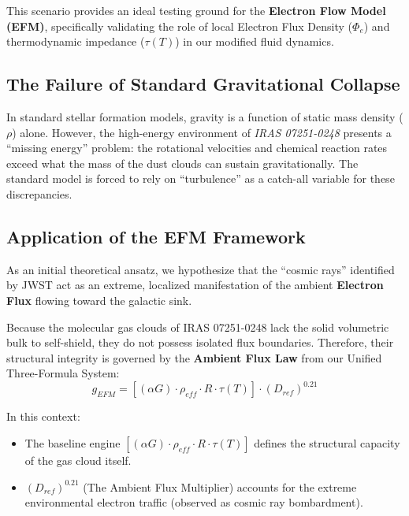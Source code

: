\documentclass[11pt, a4paper]{article}
\begin{document}
This scenario provides an ideal testing ground for the \textbf{Electron Flow Model (EFM)}, specifically validating the role of local Electron Flux Density ($\Phi_e$) and thermodynamic impedance ($\tau(T)$) in our modified fluid dynamics.

\subsection{The Failure of Standard Gravitational Collapse}
In standard stellar formation models, gravity is a function of static mass density ($\rho$) alone. However, the high-energy environment of \textit{IRAS 07251-0248} presents a ``missing energy'' problem: the rotational velocities and chemical reaction rates exceed what the mass of the dust clouds can sustain gravitationally. The standard model is forced to rely on ``turbulence'' as a catch-all variable for these discrepancies.

\subsection{Application of the EFM Framework}
As an initial theoretical ansatz, we hypothesize that the ``cosmic rays'' identified by JWST act as an extreme, localized manifestation of the ambient \textbf{Electron Flux} flowing toward the galactic sink.

Because the molecular gas clouds of IRAS 07251-0248 lack the solid volumetric bulk to self-shield, they do not possess isolated flux boundaries. Therefore, their structural integrity is governed by the \textbf{Ambient Flux Law} from our Unified Three-Formula System:
\begin{equation}
  g_{EFM} = \left[ (\alpha G) \cdot \rho_{eff} \cdot R \cdot \tau(T) \right] \cdot (D_{ref})^{0.21}
\end{equation}

In this context:
\begin{itemize}
  \item The baseline engine $\left[ (\alpha G) \cdot \rho_{eff} \cdot R \cdot \tau(T) \right]$ defines the structural capacity of the gas cloud itself.
  \item $(D_{ref})^{0.21}$ (The Ambient Flux Multiplier) accounts for the extreme environmental electron traffic (observed as cosmic ray bombardment).
\end{itemize}
\end{document}
